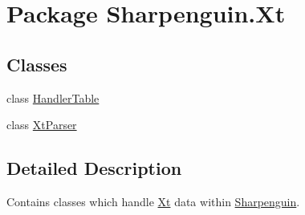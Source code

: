 \hypertarget{namespaceSharpenguin_1_1Xt}{\section{\-Package \-Sharpenguin.\-Xt}
\label{namespaceSharpenguin_1_1Xt}
}
\subsection*{\-Classes}
\begin{DoxyCompactItemize}
\item 
class \hyperlink{classSharpenguin_1_1Xt_1_1HandlerTable}{\-Handler\-Table}
\item 
class \hyperlink{classSharpenguin_1_1Xt_1_1XtParser}{\-Xt\-Parser}
\end{DoxyCompactItemize}


\subsection{\-Detailed \-Description}
\-Contains classes which handle \hyperlink{namespaceSharpenguin_1_1Xt}{\-Xt} data within \hyperlink{namespaceSharpenguin}{\-Sharpenguin}. 